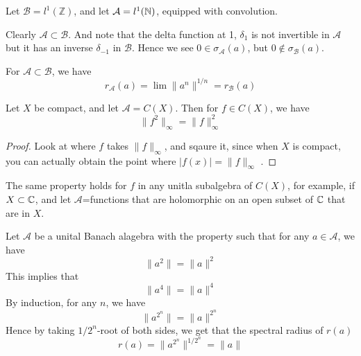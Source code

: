 \begin{example}
    Let $\mathcal{B}=l^1(\mathbb{Z})$, and let $\mathcal{A}=l^1(\mathbb{N})$, equipped with convolution. 
    
    Clearly $\mathcal{A}\subset\mathcal{B}$. And note that the delta function at 1, $\delta_1$ is not invertible in $\mathcal{A}$ but it has an inverse $\delta_{-1}$ in $\mathcal{B}$. Hence we see $0\in\sigma_\mathcal{A}(a)$, but $0\not\in\sigma_\mathcal{B}(a)$.


\end{example}

\begin{proposition}
    For $\mathcal{A}\subset\mathcal{B}$, we have
    \begin{equation*}
        r_\mathcal{A}(a)=\lim\|a^n\|^{1/n}=r_\mathcal{B}(a)
    \end{equation*}
\end{proposition}

\begin{proposition}
    Let $X$ be compact, and let $\mathcal{A}=C(X)$. Then for $f\in C(X)$, we have
    \begin{equation*}
        \|f^2\|_\infty=\|f\|_\infty^2
    \end{equation*}
\end{proposition}
\begin{proof}
    Look at where $f$ takes $\|f\|_\infty$, and sqaure it, since when $X$ is compact, you can actually obtain the point where $|f(x)|=\|f\|_\infty$ .
\end{proof}

\begin{remark}
The same property holds for $f$ in any unitla subalgebra of $C(X)$, for example, if $X\subset\mathbb{C}$, and let $\mathcal{A}$=functions that are holomorphic on an open subset of $\mathbb{C}$ that are in $X$.
\end{remark}

Let $\mathcal{A}$ be a unital Banach alagebra with the property such that for any $a\in\mathcal{A}$, we have
\begin{equation*}
    \|a^2\|=\|a\|^2
\end{equation*}
This implies that
\begin{equation*}
    \|a^4\|=\|a\|^4
\end{equation*}
By induction, for any $n$, we have
\begin{equation*}
    \|a^{2^n}\|=\|a\|^{2^n}
\end{equation*}
Hence by taking $1/2^n$-root of both sides, we get that the spectral radius of $r(a)$
\begin{equation*}
    r(a)=\|a^{2^n}\|^{1/2^n}=\|a\|
\end{equation*}

